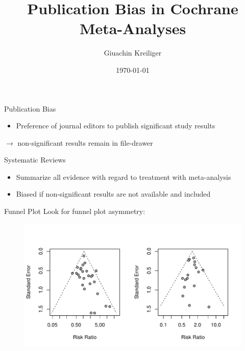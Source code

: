 \documentclass[english]{beamer}\usepackage[]{graphicx}\usepackage[]{color}
\title{Publication Bias in Cochrane Meta-Analyses}%
\author{Giuachin Kreiliger}
\date{\today}
\makeatletter
\def\maxwidth{ %
  \ifdim\Gin@nat@width>\linewidth
    \linewidth
  \else
    \Gin@nat@width
  \fi
}
\newenvironment{knitrout}{}{} %
\makeatother
\begin{document}
\maketitle


\begin{frame}{Publication Bias}
\begin{itemize}
\item Preference of journal editors to publish significant study results
\end{itemize}
\hspace{2mm} $\rightarrow$ \hspace{2mm} non-significant results remain in file-drawer
\end{frame}


\begin{frame}{Systematic Reviews}
\begin{itemize}
\item Summarize all evidence with regard to treatment with meta-analysis
\item Biased if non-significant results are not available and included
\end{itemize}
\end{frame}

\begin{frame}[fragile]{Funnel Plot}
Look for funnel plot asymmetry:

\vspace{-5mm}
\begin{figure}
\begin{knitrout}
\color{fgcolor}
\includegraphics[width=\maxwidth]{figure/unnamed-chunk-2-1} 

\end{knitrout}
\end{figure}

\end{frame}
\end{document}
